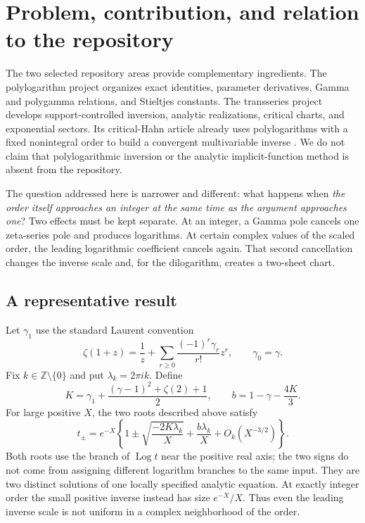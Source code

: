\documentclass[11pt,a4paper]{article}
\numberwithin{equation}{section}
\theoremstyle{definition}\newtheorem{definition}[theorem]{Definition}
\theoremstyle{remark}\newtheorem{remark}[theorem]{Remark}
\DeclareMathOperator{\Log}{Log}
\begin{document}
\section{Problem, contribution, and relation to the repository}
\label{sec:intro}
The two selected repository areas provide complementary ingredients. The
polylogarithm project organizes exact identities, parameter derivatives,
Gamma and polygamma relations, and Stieltjes constants. The transseries
project develops support-controlled inversion, analytic realizations,
critical charts, and exponential sectors. Its critical-Hahn article already
uses polylogarithms with a fixed nonintegral order to build a convergent
multivariable inverse \cite{repo-poly,repo-trans,repo-hahn}. We do not claim
that polylogarithmic inversion or the analytic implicit-function method is
absent from the repository.

The question addressed here is narrower and different: what happens when
\emph{the order itself approaches an integer at the same time as the
argument approaches one}? Two effects must be kept separate. At an integer,
a Gamma pole cancels one zeta-series pole and produces logarithms. At certain
complex values of the scaled order, the leading logarithmic coefficient
cancels again. That second cancellation changes the inverse scale and, for
the dilogarithm, creates a two-sheet chart.

\subsection{A representative result}
Let $\gamma_1$ use the standard Laurent convention
\begin{equation}\label{eq:stieltjes}
 \zeta(1+z)=\frac1z+\sum_{r\ge0}\frac{(-1)^r\gamma_r}{r!}z^r,
 \qquad \gamma_0=\gamma.
\end{equation}
Fix $k\in\mathbb Z\setminus\{0\}$ and put $\lambda_k=2\pi i k$. Define
\begin{equation}\label{eq:Kintro}
 K=\gamma_1+\frac{(\gamma-1)^2+\zeta(2)+1}{2},\qquad
 b=1-\gamma-\frac{4K}{3}.
\end{equation}
For large positive $X$, the two roots described above satisfy
\begin{equation}\label{eq:headline}
 t_\pm=e^{-X}\left\{1\pm\sqrt{\frac{-2K\lambda_k}{X}}
       +\frac{b\lambda_k}{X}+O_k(X^{-3/2})\right\}.
\end{equation}
Both roots use the branch of $\Log t$ near the positive real axis; the two
signs do not come from assigning different logarithm branches to the same
input. They are two distinct solutions of one locally specified analytic
equation. At exactly integer order the small positive inverse instead has
size $e^{-X}/X$. Thus even the leading inverse scale is not uniform in a
complex neighborhood of the order.
\end{document}

